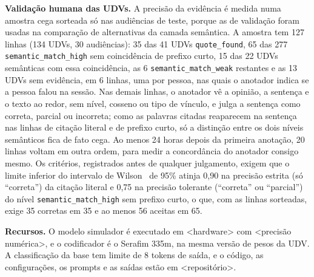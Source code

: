 \textbf{Validação humana das UDVs.} A precisão da evidência é medida numa amostra cega sorteada só
nas audiências de teste, porque as de validação foram usadas na comparação de alternativas da camada
semântica. A amostra tem 127 linhas (134 UDVs, 30 audiências): 35 das 41 UDVs \texttt{quote\_found},
65 das 277 \texttt{semantic\_match\_high} sem coincidência de prefixo curto, 15 das 22 UDVs semânticas
com essa coincidência, as 6 \texttt{semantic\_match\_weak} restantes e as 13 UDVs sem evidência, em 6
linhas, uma por pessoa, nas quais o anotador indica se a pessoa falou na sessão. Nas demais linhas, o
anotador vê a opinião, a sentença e o texto ao redor, sem nível, cosseno ou tipo de vínculo, e julga a
sentença como correta, parcial ou incorreta; como as palavras citadas reaparecem na sentença nas
linhas de citação literal e de prefixo curto, só a distinção entre os dois níveis semânticos fica de
fato cega. Ao menos 24 horas depois da primeira anotação, 20 linhas voltam em outra ordem, para medir
a concordância do anotador consigo mesmo. Os critérios, registrados antes de qualquer julgamento,
exigem que o limite inferior do intervalo de Wilson~\citep{wilson1927probable} de 95\% atinja 0,90 na
precisão estrita (só ``correta'') da citação literal e 0,75 na precisão tolerante (``correta'' ou
``parcial'') do nível \texttt{semantic\_match\_high} sem prefixo curto, o que, com as linhas
sorteadas, exige 35 corretas em 35 e ao menos 56 aceitas em 65.

\textbf{Recursos.} O modelo simulador é executado em <hardware> com <precisão numérica>, e o
codificador é o Serafim 335m, na mesma versão de pesos da UDV. A classificação da base tem limite de 8
tokens de saída, e o código, as configurações, os prompts e as saídas estão em <repositório>.
